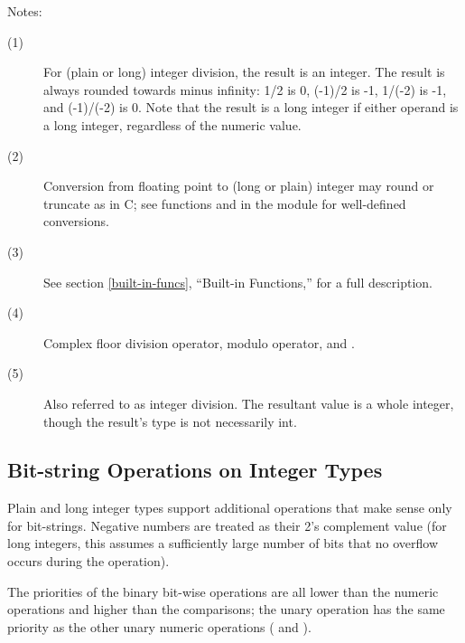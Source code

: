 \noindent
Notes:
\begin{description}

\item[(1)]
For (plain or long) integer division, the result is an integer.
The result is always rounded towards minus infinity: 1/2 is 0,
(-1)/2 is -1, 1/(-2) is -1, and (-1)/(-2) is 0.  Note that the result
is a long integer if either operand is a long integer, regardless of
the numeric value.

\item[(2)]
Conversion from floating point to (long or plain) integer may round or
truncate as in C; see functions  and
 in the  module
for well-defined conversions.

\item[(3)]
See section \ref{built-in-funcs}, ``Built-in Functions,'' for a full
description.

\item[(4)]
Complex floor division operator, modulo operator, and .


\item[(5)]
Also referred to as integer division.  The resultant value is a whole integer,
though the result's type is not necessarily int.
\end{description}

\subsection{Bit-string Operations on Integer Types \label{bitstring-ops}}

Plain and long integer types support additional operations that make
sense only for bit-strings.  Negative numbers are treated as their 2's
complement value (for long integers, this assumes a sufficiently large
number of bits that no overflow occurs during the operation).

The priorities of the binary bit-wise operations are all lower than
the numeric operations and higher than the comparisons; the unary
operation \samp{\~} has the same priority as the other unary numeric
operations (\samp{+} and \samp{-}).


